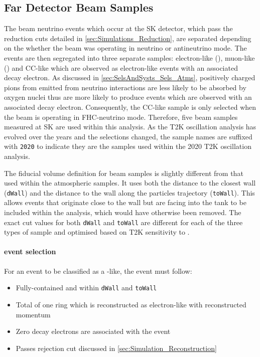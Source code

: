 \subsection{Far Detector Beam Samples}
\label{sec:SelsAndSysts_Sels_FD}

The beam neutrino events which occur at the SK detector, which pass the reduction cuts detailed in \autoref{sec:Simulations_Reduction}, are separated depending on the whether the beam was operating in neutrino or antineutrino mode. The events are then segregated into three separate samples: electron-like (), muon-like () and CC\quickmath{1\pi^{+}}-like which are observed as electron-like events with an associated decay electron. As discussed in \autoref{sec:SelsAndSysts_Sels_Atms}, positively charged pions from emitted from neutrino interactions are less likely to be absorbed by oxygen nuclei thus are more likely to produce events which are observed with an associated decay electron. Consequently, the CC\quickmath{1\pi^{+}}-like sample is only selected when the beam is operating in FHC-neutrino mode. Therefore, five beam samples measured at SK are used within this analysis. As the T2K oscillation analysis has evolved over the years and the selections changed, the sample names are suffixed with \texttt{2020} to indicate they are the samples used within the 2020 T2K oscillation analysis.

The fiducial volume definition for beam samples is slightly different from that used within the atmospheric samples.  It uses both the distance to the closest wall (\texttt{dWall}) and the distance to the wall along the particles trajectory (\texttt{toWall}). This allows events that originate close to the wall but are facing into the tank to be included within the analysis, which would have otherwise been removed. The exact cut values for both \texttt{dWall} and \texttt{toWall} are different for each of the three types of sample and optimised based on T2K sensitivity to \dcp \cite{t2k_tn_318, t2k_tn_319}.

\paragraph{ event selection}

For an event to be classified as a -like, the event must follow:

\begin{itemize}
\item Fully-contained and within \texttt{dWall}  and \texttt{toWall} 
\item Total of one ring which is reconstructed as electron-like with reconstructed momentum 
\item Zero decay electrons are associated with the event
\item Passes  rejection cut discussed in \autoref{sec:Simulation_Reconstruction}
\end{itemize}

